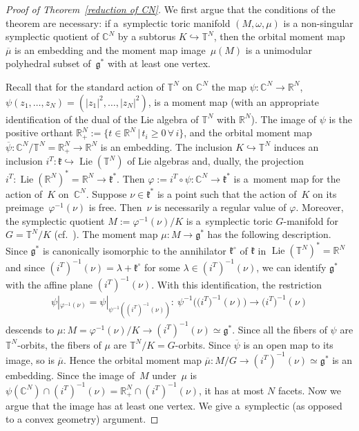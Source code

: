 \documentclass[pdftex]{sigma}
\numberwithin{equation}{section}
\begin{document}
\begin{proof}[Proof of Theorem~\ref{reduction of CN}]
  We f\/irst argue that the conditions of the theorem are necessary: if
  a~symplectic toric manifold $(M,\omega, \mu)$ is a non-singular
  symplectic quotient of ${\mathbb C}^N$ by a subtorus $K\hookrightarrow {\mathbb T}^N$,
  then the orbital moment map $\overline{\mu}$ is an embedding and the
  moment map image~$\mu(M)$ is a unimodular polyhedral subset of~${\mathfrak g}^*$ with at least one vertex.

  Recall that for the standard action of ${\mathbb T}^N$ on ${\mathbb C}^N$ the map
  $\psi \colon {\mathbb C}^N \to {\mathbb R}^N$,   $\psi(z_1, \ldots, z_N) = (|z_1|^2,
  \ldots, |z_N|^2)$, is a moment map (with an appropriate
  identif\/ication of the dual of the Lie algebra of ${\mathbb T}^N$ with
  ${\mathbb R}^N$).
  The image of $\psi$ is the positive orthant ${\mathbb R}^N_+ :=
  \{t\in {\mathbb R}^N\,|\, t_i\geq 0 \, \forall\, i\}$,
  and the orbital moment map
  $\overline{\psi} \colon {\mathbb C}^N/{\mathbb T}^N = {\mathbb R}^N_+\to {\mathbb R}^N$ is an embedding.
  The inclusion $K\hookrightarrow {\mathbb T}^N$ induces an
  inclusion $i^T \colon {\mathfrak k}\hookrightarrow \operatorname{Lie}({\mathbb T}^N)$ of Lie algebras
  and, dually, the projection $i^T \colon \operatorname{Lie}({\mathbb R}^N)^*= {\mathbb R}^N\to
  {\mathfrak k}^*$.  Then $\varphi:=i^T\circ \psi \colon {\mathbb C}^N\to {\mathfrak k}^*$ is a~moment map for the action of~$K$ on~${\mathbb C}^N$.  Suppose $\nu\in {\mathfrak k}^*$
  is a point such that the action of~$K$ on its preimage~$\varphi^{-1}
  (\nu)$ is free. Then~$\nu$ is necessarily a regular value of
  $\varphi$. Moreover, the symplectic quotient $M:= \varphi ^{-1}
  (\nu)/K$ is a~symplectic toric $G$-manifold for $G= {\mathbb T}^N/K$ (cf.~\cite{De}).  The moment map $\mu \colon M\to {\mathfrak g}^*$ has the
  following description.  Since ${\mathfrak g}^*$ is canonically isomorphic to
  the annihilator ${\mathfrak k}^\circ$ of ${\mathfrak k}$ in $\operatorname{Lie}({\mathbb T}^N)^* ={\mathbb R}^N$ and
  since $(i^T)^{-1} (\nu) = \lambda + {\mathfrak k}^\circ$ for some $\lambda \in
  (i^T)^{-1} (\nu)$, we can identify ${\mathfrak g}^*$ with the af\/f\/ine plane
  $(i^T)^{-1} (\nu)$.  With this identif\/ication, the restriction
\begin{gather*}
\psi|_{\varphi^{-1} (\nu)} = \psi|_{\psi^{-1} ((i^T)^{-1} (\nu))} \colon
\  \psi^{-1} \big(\big(i^T\big)^{-1} (\nu)\big)   \to   \big(i^T\big)^{-1} (\nu)
\end{gather*}
descends to $\mu \colon M=\varphi^{-1} (\nu)/K \to (i^T)^{-1} (\nu)\simeq
{\mathfrak g}^*$.  Since all the f\/ibers of $\psi$ are ${\mathbb T}^N$-orbits, the f\/ibers
of $\mu$ are ${\mathbb T}^N/K= G$-orbits.  Since $\overline{\psi}$ is an open map
to its image, so is $\overline{\mu}$.
Hence the orbital moment map
$\overline{\mu} \colon M/G\to (i^T)^{-1} (\nu) \simeq {\mathfrak g}^*$ is an embedding.
Since the image of~$M$ under~$\mu$ is $\psi({\mathbb C}^N) \cap (i^T)^{-1} (\nu)
= {\mathbb R}^N_+ \cap (i^T)^{-1} (\nu)$, it has at most $N$ facets.  Now we
argue that the image has at least one vertex.  We give a~symplectic (as opposed to a convex geometry) argument.


\end{proof}
\end{document}
